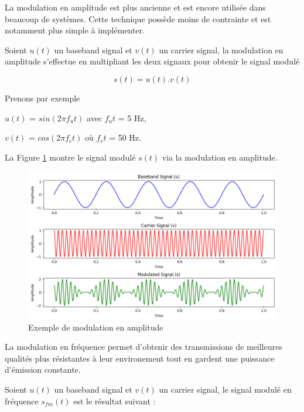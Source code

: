 La modulation en amplitude est plus ancienne et est encore utilisée dans beaucoup de systèmes. Cette technique possède moins de contrainte et est notamment plus simple à implémenter.

\vspace{0.1cm}

Soient $u(t)$ un baseband signal et $v(t)$ un carrier signal, la modulation en amplitude s'effectue en multipliant les deux signaux pour obtenir le signal modulé 

\begin{equation}\label{eq2}
s(t) = u(t) . v(t)
\end{equation}

Prenons par exemple 

$u(t)$ = $sin(2\pi f_{u}t)$ avec $f_{u}t$ = 5 Hz,

$v(t)$ = $cos(2\pi f_{c}t)$ où $f_{c}t$ = 50 Hz.

La Figure \ref{term1} montre le signal modulé $s(t)$ via la modulation en amplitude.

\newpage

\begin{figure}[h]
\centering

\includegraphics[scale=0.5]{images/AM_mod.PNG}
\caption{Exemple de modulation en amplitude}\label{term1}
\end{figure}


La modulation en fréquence permet d'obtenir des transmissions de meilleures qualités plus résistantes à leur environement tout en gardent une puissance d'émission constante. 

\vspace{0.1cm}

Soient $u(t)$ un baseband signal et $v(t)$ un carrier signal, le signal modulé en fréquence $s_{fm}(t)$ est le résultat suivant :

